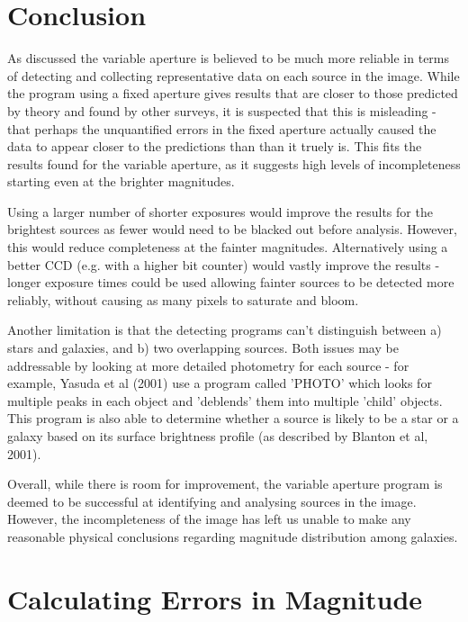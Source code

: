 \documentclass[a4paper,11pt,twoside]{article}
\begin{document}
\section{Conclusion}

As discussed the variable aperture is believed to be much 
more reliable in terms of detecting and collecting 
representative data on each source in the image. 
While the program using a fixed aperture gives results that are 
closer to those predicted by theory and found by other surveys, 
it is suspected that this is misleading - that perhaps 
the unquantified errors in the fixed aperture actually 
caused the data to appear closer to the predictions than 
than it truely is. This fits the results found for the variable 
aperture, as it suggests high levels of incompleteness 
starting even at the brighter magnitudes.

Using a larger number of shorter exposures would improve 
the results for the brightest sources as fewer would need 
to be blacked out before analysis. However, this would reduce 
completeness at the fainter magnitudes.
Alternatively using a better CCD (e.g. with a higher bit counter) 
would vastly improve the results - longer exposure times 
could be used allowing fainter sources to be detected more 
reliably, without causing as many pixels to saturate and 
bloom.

Another limitation is that the detecting programs can't distinguish 
between a) stars and galaxies, and b) two overlapping sources. 
Both issues may be addressable by looking at more detailed photometry 
for each source - for example, Yasuda et al (2001)\cite{yasuda} use a 
program called 'PHOTO' which looks for multiple peaks in each object 
and 'deblends' them into multiple 'child' objects. This program is also 
able to determine whether a source is likely to be a star or 
a galaxy based on its surface brightness profile 
(as described by Blanton et al, 2001\cite{blanton}).

Overall, while there is room for improvement, the variable 
aperture program is deemed to be successful at identifying
and analysing sources in the image. However, the incompleteness 
of the image has left us unable to make any reasonable physical 
conclusions regarding magnitude distribution among galaxies.

\appendix

\section{Calculating Errors in Magnitude}
\end{document}
